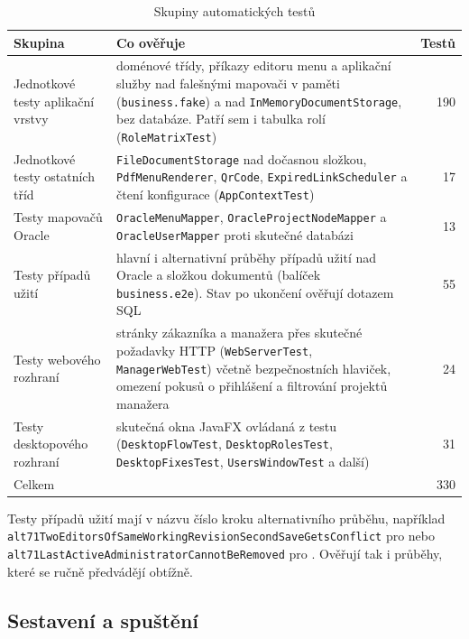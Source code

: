\begin{table}[H]
  \centering
  \small
  \caption{Skupiny automatických testů}\label{tab:impl:tests}
  \begin{tabularx}{\textwidth}{@{}>{\raggedright\arraybackslash}p{4cm}>{\raggedright\arraybackslash}Xr@{}}
    \toprule
    Skupina & Co ověřuje & Testů \\
    \midrule
    Jednotkové testy aplikační vrstvy & doménové třídy, příkazy editoru menu a aplikační služby nad falešnými mapovači v paměti (\texttt{business.fake}) a nad \texttt{InMemoryDocumentStorage}, bez databáze. Patří sem i tabulka rolí (\texttt{RoleMatrixTest}) & 190 \\
    Jednotkové testy ostatních tříd & \texttt{FileDocumentStorage} nad dočasnou složkou, \texttt{PdfMenuRenderer}, \texttt{QrCode}, \texttt{ExpiredLinkScheduler} a čtení konfigurace (\texttt{AppContextTest}) & 17 \\
    Testy mapovačů Oracle & \texttt{OracleMenuMapper}, \texttt{OracleProjectNodeMapper} a \texttt{OracleUserMapper} proti skutečné databázi & 13 \\
    Testy případů užití & hlavní i alternativní průběhy případů užití nad Oracle a složkou dokumentů (balíček \texttt{business.e2e}). Stav po ukončení ověřují dotazem SQL & 55 \\
    Testy webového rozhraní & stránky zákazníka a manažera přes skutečné požadavky HTTP (\texttt{WebServerTest}, \texttt{ManagerWebTest}) včetně bezpečnostních hlaviček, omezení pokusů o přihlášení a filtrování projektů manažera & 24 \\
    Testy desktopového rozhraní & skutečná okna JavaFX ovládaná z testu (\texttt{DesktopFlowTest}, \texttt{DesktopRolesTest}, \texttt{DesktopFixesTest}, \texttt{UsersWindowTest} a další) & 31 \\
    \midrule
    Celkem & & 330 \\
    \bottomrule
  \end{tabularx}
\end{table}

Testy případů užití mají v názvu číslo kroku alternativního průběhu, například \texttt{alt71TwoEditorsOfSameWorkingRevisionSecondSaveGetsConflict} pro  nebo \texttt{alt71LastActiveAdministratorCannotBeRemoved} pro . Ověřují tak i průběhy, které se ručně předvádějí obtížně.

\subsection{Sestavení a spuštění}\label{sec:impl:run}

